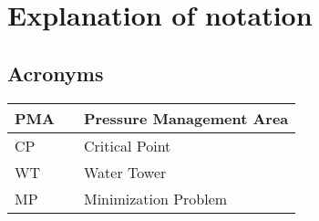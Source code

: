 \chapter{Explanation of notation}

\section{Acronyms}
\begin{table}
	\begin{tabular}{|l c l|} \hline
		PMA 		&&	Pressure Management Area		\\ \hline
		CP			&&	Critical Point					\\ \hline
		WT			&&	Water Tower						\\ \hline
		MP		  	&&	Minimization Problem			\\ \hline
	\end{tabular}
\end{table}

